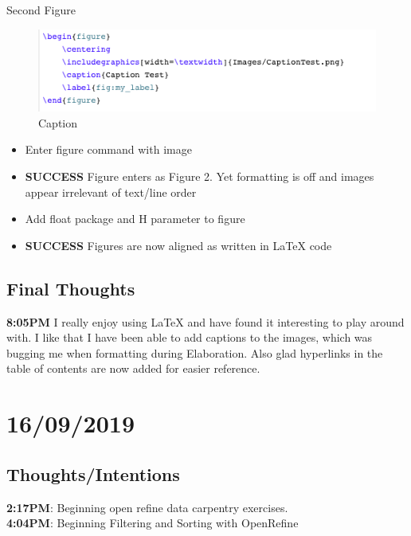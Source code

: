 \documentclass{article}
\begin{document}
Second Figure 
\begin{figure}[H]
    \centering
    \includegraphics[width=\textwidth]{Images/CaptionTest2.png}
    \caption{Caption}
    \label{fig:my_label}
\end{figure}
\begin{itemize}
\item Enter figure command with image
\item \textbf{SUCCESS} Figure enters as Figure 2. Yet formatting is off and images appear irrelevant of text/line order
\item Add float package and H parameter to figure 
\item \textbf{SUCCESS} Figures are now aligned as written in LaTeX code
\end{itemize}

\subsection{Final Thoughts}
\textbf{8:05PM} I really enjoy using LaTeX and have found it interesting to play around with. I like that I have been able to add captions to the images, which was bugging me when formatting during Elaboration. Also glad hyperlinks in the table of contents are now added for easier reference.

\section{16/09/2019}
\subsection{Thoughts/Intentions}
\textbf{2:17PM}: Beginning open refine data carpentry exercises. \\
\textbf{4:04PM}: Beginning Filtering and Sorting with OpenRefine
\end{document}
